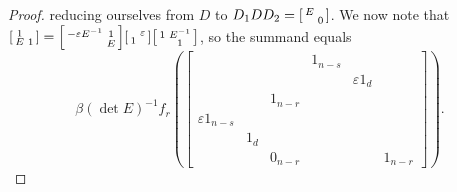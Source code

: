 \begin{proof}
	reducing ourselves from $D$ to $D_1DD_2=\begin{bsmallmatrix}
		E \\ & 0
	\end{bsmallmatrix}$.
    We now note that $\begin{bsmallmatrix}
		1 \\ E & 1
	\end{bsmallmatrix}=\begin{bsmallmatrix}
		-\varepsilon E^{-1} & 1 \\ & E
	\end{bsmallmatrix}\begin{bsmallmatrix}
		& \varepsilon \\ 1
	\end{bsmallmatrix}\begin{bsmallmatrix}
		1 & E^{-1} \\ & 1
	\end{bsmallmatrix}$,
    so the summand equals
    \[\beta(\det E)^{-1}f_r\left(\begin{bmatrix}
		&&& 1_{n-s} \\ &&&& \varepsilon1_d \\ && 1_{n-r} \\
		\varepsilon1_{n-s} \\ & 1_d \\ && 0_{n-r} &&& 1_{n-r}
	\end{bmatrix}\right).\]

\end{proof}
